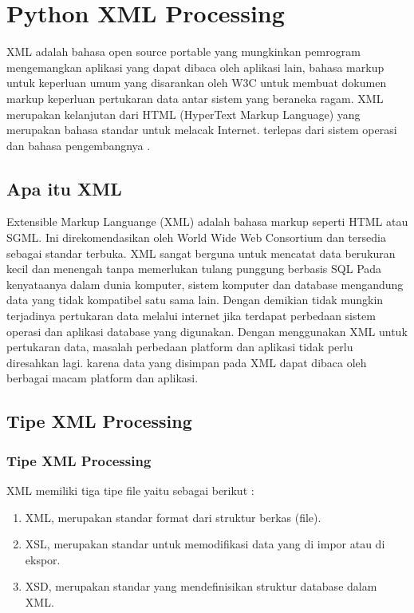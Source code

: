 

\section{Python XML Processing}
  XML adalah bahasa open source portable yang mungkinkan pemrogram mengemangkan aplikasi yang dapat dibaca oleh aplikasi lain, bahasa markup untuk keperluan umum yang disarankan oleh W3C untuk membuat dokumen markup keperluan pertukaran data antar sistem yang beraneka ragam. XML merupakan kelanjutan dari HTML (HyperText Markup Language) yang merupakan bahasa standar untuk melacak Internet.
terlepas dari sistem operasi dan bahasa pengembangnya .
\subsection{Apa itu XML}
  Extensible Markup Languange (XML) adalah bahasa markup seperti HTML atau SGML. 
Ini direkomendasikan oleh World Wide Web Consortium dan tersedia sebagai standar terbuka.
XML sangat berguna untuk mencatat data berukuran kecil dan menengah tanpa memerlukan tulang punggung berbasis SQL  
Pada kenyataanya dalam dunia komputer, sistem komputer dan database mengandung data yang tidak kompatibel satu sama lain. Dengan demikian tidak mungkin terjadinya pertukaran data melalui internet jika terdapat perbedaan sistem operasi dan aplikasi database yang digunakan.
Dengan menggunakan XML untuk pertukaran data, masalah perbedaan platform dan aplikasi tidak perlu diresahkan lagi. karena data yang disimpan pada XML dapat dibaca oleh berbagai macam platform dan aplikasi.

\subsection{Tipe XML Processing}
\subsubsection{Tipe XML Processing}
XML memiliki tiga tipe file yaitu sebagai berikut :
\begin{enumerate}
\item XML, merupakan standar format dari struktur berkas (file).
\item XSL, merupakan standar untuk memodifikasi data yang di impor atau di ekspor.
\item XSD, merupakan standar yang mendefinisikan struktur database dalam XML.
\end{enumerate}

